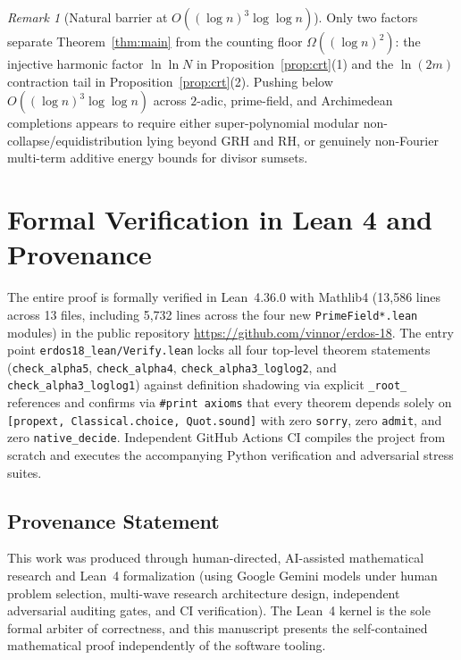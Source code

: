 \documentclass[11pt,a4paper]{amsart}
\theoremstyle{definition}
\theoremstyle{remark}
\newtheorem{remark}[theorem]{Remark}
\begin{document}
\begin{remark}[Natural barrier at $O((\log n)^3 \log\log n)$]\label{rem:barrier}
Only two factors separate Theorem~\ref{thm:main} from the counting floor $\Omega((\log n)^2)$: the injective harmonic factor $\ln\ln N$ in Proposition~\ref{prop:crt}(1) and the $\ln(2m)$ contraction tail in Proposition~\ref{prop:crt}(2). Pushing below $O((\log n)^3 \log\log n)$ across $2$-adic, prime-field, and Archimedean completions appears to require either super-polynomial modular non-collapse/equidistribution lying beyond GRH and RH, or genuinely non-Fourier multi-term additive energy bounds for divisor sumsets.
\end{remark}

\section{Formal Verification in Lean 4 and Provenance}\label{sec:provenance}

The entire proof is formally verified in Lean~4.36.0 with Mathlib4 (13,586 lines across 13 files, including 5,732 lines across the four new \texttt{PrimeField*.lean} modules) in the public repository \url{https://github.com/vinnor/erdos-18}. The entry point \texttt{erdos18\_lean/Verify.lean} locks all four top-level theorem statements (\texttt{check\_alpha5}, \texttt{check\_alpha4}, \texttt{check\_alpha3\_loglog2}, and \texttt{check\_alpha3\_loglog1}) against definition shadowing via explicit \texttt{\_root\_} references and confirms via \texttt{\#print axioms} that every theorem depends solely on \texttt{[propext, Classical.choice, Quot.sound]} with zero \texttt{sorry}, zero \texttt{admit}, and zero \texttt{native\_decide}. Independent GitHub Actions CI compiles the project from scratch and executes the accompanying Python verification and adversarial stress suites.

\subsection*{Provenance Statement}
This work was produced through human-directed, AI-assisted mathematical research and Lean~4 formalization (using Google Gemini models under human problem selection, multi-wave research architecture design, independent adversarial auditing gates, and CI verification). The Lean~4 kernel is the sole formal arbiter of correctness, and this manuscript presents the self-contained mathematical proof independently of the software tooling.
\end{document}
